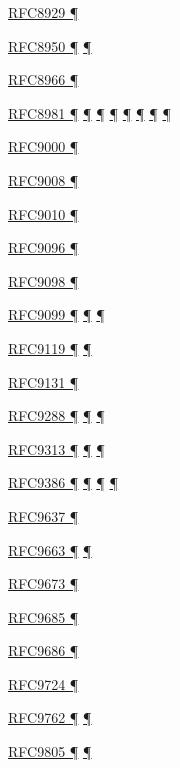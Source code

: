 \documentclass[
]{article}
\begin{document}
\hyperref[address-resolution]{RFC8929 ¶}

\hyperref[routing]{RFC8950 ¶} \hyperref[tunnels]{¶}

\hyperref[routing]{RFC8966 ¶}

\hyperref[addresses]{RFC8981 ¶} \hyperref[auto-configuration]{¶}
\hyperref[layer-2-considerations]{¶} \hyperref[topology-obfuscation]{¶}
\hyperref[prefix-per-host]{¶}
\hyperref[address-and-prefix-management]{¶}
\hyperref[multi-prefix-operation]{¶} \hyperref[security-operation]{¶}

\hyperref[transport-protocols]{RFC9000 ¶}

\hyperref[routing]{RFC9008 ¶}

\hyperref[routing]{RFC9010 ¶}

\hyperref[routing]{RFC9096 ¶}

\hyperref[extension-headers-and-options]{RFC9098 ¶}

\hyperref[security]{RFC9099 ¶}
\hyperref[address-and-prefix-management]{¶}
\hyperref[security-operation]{¶}

\hyperref[address-resolution]{RFC9119 ¶} \hyperref[layer-2-functions]{¶}

\hyperref[address-resolution]{RFC9131 ¶}

\hyperref[extension-headers-and-options]{RFC9288 ¶}
\hyperref[filtering]{¶} \hyperref[security-operation]{¶}

\hyperref[coexistence-with-legacy-ipv4]{RFC9313 ¶}
\hyperref[dual-stack-scenarios]{¶}
\hyperref[translation-and-ipv4-as-a-service]{¶}

\hyperref[dual-stack-scenarios]{RFC9386 ¶}
\hyperref[deployment-by-carriers]{¶}
\hyperref[deployment-in-the-enterprise]{¶} \hyperref[status]{¶}

\hyperref[addresses]{RFC9637 ¶}

\hyperref[managed-configuration]{RFC9663 ¶}
\hyperref[prefix-per-host]{¶}

\hyperref[extension-headers-and-options]{RFC9673 ¶}

\hyperref[address-resolution]{RFC9685 ¶}

\hyperref[address-and-prefix-management]{RFC9686 ¶}

\hyperref[address-and-prefix-management]{RFC9724 ¶}

\hyperref[managed-configuration]{RFC9762 ¶}
\hyperref[prefix-per-host]{¶}

\hyperref[extension-headers-and-options]{RFC9805 ¶}
\hyperref[obsolete-features-in-ipv6]{¶}
\end{document}
